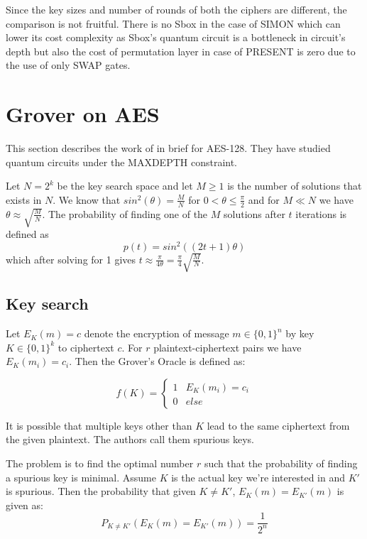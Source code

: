 \documentclass[preprint]{transcrypto}
\begin{document}
Since the key sizes and number of rounds of both the ciphers are different, the comparison is not fruitful. There is no Sbox in the case of SIMON which can lower its cost complexity as Sbox's quantum circuit is a bottleneck in circuit's depth but also the cost of permutation layer in case of PRESENT is zero due to the use of only SWAP gates.

\section{Grover on AES}\label{sec:grovaes}

This section describes the work of \cite{aeslowmc} in brief for AES-128. They have studied quantum circuits under the MAXDEPTH constraint.


Let $N=2^k$ be the key search space and let $M \geq 1$ is the number of solutions that exists in $N$. We know that $sin^2(\theta) = \frac{M}{N}$ for $0 < \theta \leq \frac{\pi}{2}$ and for $M \ll N$ we have $\theta \approx \sqrt{\frac{M}{N}}$. The probability of finding one of the $M$ solutions after $t$ iterations is defined as 
\begin{equation*}
    p(t) = sin^2((2t+1)\theta)
\end{equation*}
which after solving for 1 gives $t\approx \frac{\pi}{4\theta} = \frac{\pi}{4} \sqrt{\frac{M}{N}}$.

\subsection{Key search}

Let $E_K(m) = c$ denote the encryption of message $m \in \{ 0,1\}^n$ by key $K\in \{0,1\}^k$ to ciphertext $c$. For $r$ plaintext-ciphertext pairs we have $E_K(m_i) = c_i$. Then the Grover's Oracle is defined as:

\begin{equation*}
 f(K) = 
 \begin{cases} 
      1 & E_K(m_i) = c_i  \\
      0 & else 
  \end{cases}
\end{equation*}

It is possible that multiple keys other than $K$ lead to the same ciphertext from the given plaintext. The authors call them spurious keys.

The problem is to find the optimal number $r$ such that the probability of finding a spurious key is minimal. Assume $K$ is the actual key we're interested in and $K'$ is spurious. Then the probability that given $K \not = K'$, $E_K(m) = E_{K'}(m)$ is given as:
\begin{equation*}
    P_{K \not = K'}(E_K(m) = E_{K'}(m)) = \frac{1}{2^n}
\end{equation*}
\end{document}
